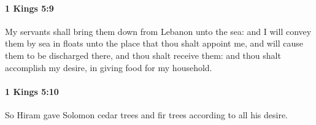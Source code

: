 		\paragraph{1 Kings 5:9} %
			\label{1KINGS-5-9}

			My servants shall bring them down from Lebanon unto the sea: and I will convey them by sea in floats unto the place that thou shalt appoint me, and will cause them to be discharged there, and thou shalt receive them: and thou shalt accomplish my desire, in giving food for my household.


		\paragraph{1 Kings 5:10} %
			\label{1KINGS-5-10}

			So Hiram gave Solomon cedar trees and fir trees according to all his desire.


